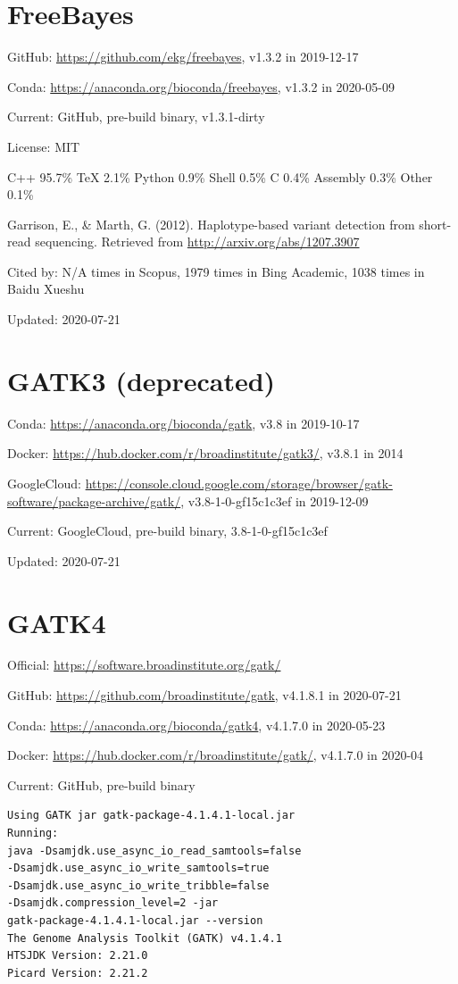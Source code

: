 \documentclass[]{article}
\newcommand{\cb}[3]{\par Cited by: {\color{blue}\Huge #1} times in Scopus, {\color{blue}\Huge #2} times in Bing Academic, {\color{blue}\Huge #3} times in Baidu Xueshu}
\begin{document}
\section{FreeBayes}

GitHub: \url{https://github.com/ekg/freebayes}, v1.3.2 in 2019-12-17

Conda: \url{https://anaconda.org/bioconda/freebayes}, v1.3.2 in 2020-05-09

Current: GitHub, pre-build binary, v1.3.1-dirty

License: MIT

C++ 95.7\% TeX 2.1\% Python 0.9\% Shell 0.5\% C 0.4\% Assembly 0.3\% Other 0.1\%

Garrison, E., \& Marth, G. (2012). Haplotype-based variant detection from short-read sequencing. Retrieved from \url{http://arxiv.org/abs/1207.3907}\cb{N/A}{1979}{1038}

Updated: 2020-07-21

\section{GATK3 (deprecated)}

Conda: \url{https://anaconda.org/bioconda/gatk}, v3.8 in 2019-10-17

Docker: \url{https://hub.docker.com/r/broadinstitute/gatk3/}, v3.8.1 in 2014

GoogleCloud: \url{https://console.cloud.google.com/storage/browser/gatk-software/package-archive/gatk/}, v3.8-1-0-gf15c1c3ef in 2019-12-09

Current: GoogleCloud, pre-build binary, 3.8-1-0-gf15c1c3ef

Updated: 2020-07-21

\section{GATK4}

Official: \url{https://software.broadinstitute.org/gatk/}

GitHub: \url{https://github.com/broadinstitute/gatk}, v4.1.8.1 in 2020-07-21

Conda: \url{https://anaconda.org/bioconda/gatk4}, v4.1.7.0 in 2020-05-23

Docker: \url{https://hub.docker.com/r/broadinstitute/gatk/}, v4.1.7.0 in 2020-04

Current: GitHub, pre-build binary

\begin{verbatim}
Using GATK jar gatk-package-4.1.4.1-local.jar
Running:
java -Dsamjdk.use_async_io_read_samtools=false
-Dsamjdk.use_async_io_write_samtools=true
-Dsamjdk.use_async_io_write_tribble=false
-Dsamjdk.compression_level=2 -jar 
gatk-package-4.1.4.1-local.jar --version
The Genome Analysis Toolkit (GATK) v4.1.4.1
HTSJDK Version: 2.21.0
Picard Version: 2.21.2
\end{verbatim}
\end{document}
